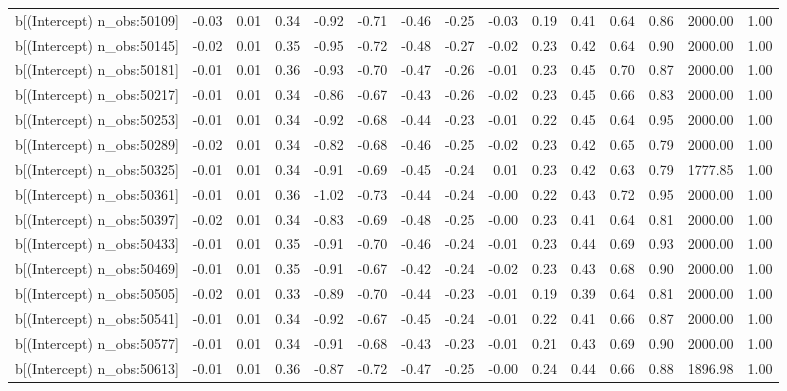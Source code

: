 \begin{table}[ht]
\begin{tabular}{rrrrrrrrrrrrrrr}
  b[(Intercept) n\_obs:50109] & -0.03 & 0.01 & 0.34 & -0.92 & -0.71 & -0.46 & -0.25 & -0.03 & 0.19 & 0.41 & 0.64 & 0.86 & 2000.00 & 1.00 \\ 
  b[(Intercept) n\_obs:50145] & -0.02 & 0.01 & 0.35 & -0.95 & -0.72 & -0.48 & -0.27 & -0.02 & 0.23 & 0.42 & 0.64 & 0.90 & 2000.00 & 1.00 \\ 
  b[(Intercept) n\_obs:50181] & -0.01 & 0.01 & 0.36 & -0.93 & -0.70 & -0.47 & -0.26 & -0.01 & 0.23 & 0.45 & 0.70 & 0.87 & 2000.00 & 1.00 \\ 
  b[(Intercept) n\_obs:50217] & -0.01 & 0.01 & 0.34 & -0.86 & -0.67 & -0.43 & -0.26 & -0.02 & 0.23 & 0.45 & 0.66 & 0.83 & 2000.00 & 1.00 \\ 
  b[(Intercept) n\_obs:50253] & -0.01 & 0.01 & 0.34 & -0.92 & -0.68 & -0.44 & -0.23 & -0.01 & 0.22 & 0.45 & 0.64 & 0.95 & 2000.00 & 1.00 \\ 
  b[(Intercept) n\_obs:50289] & -0.02 & 0.01 & 0.34 & -0.82 & -0.68 & -0.46 & -0.25 & -0.02 & 0.23 & 0.42 & 0.65 & 0.79 & 2000.00 & 1.00 \\ 
  b[(Intercept) n\_obs:50325] & -0.01 & 0.01 & 0.34 & -0.91 & -0.69 & -0.45 & -0.24 & 0.01 & 0.23 & 0.42 & 0.63 & 0.79 & 1777.85 & 1.00 \\ 
  b[(Intercept) n\_obs:50361] & -0.01 & 0.01 & 0.36 & -1.02 & -0.73 & -0.44 & -0.24 & -0.00 & 0.22 & 0.43 & 0.72 & 0.95 & 2000.00 & 1.00 \\ 
  b[(Intercept) n\_obs:50397] & -0.02 & 0.01 & 0.34 & -0.83 & -0.69 & -0.48 & -0.25 & -0.00 & 0.23 & 0.41 & 0.64 & 0.81 & 2000.00 & 1.00 \\ 
  b[(Intercept) n\_obs:50433] & -0.01 & 0.01 & 0.35 & -0.91 & -0.70 & -0.46 & -0.24 & -0.01 & 0.23 & 0.44 & 0.69 & 0.93 & 2000.00 & 1.00 \\ 
  b[(Intercept) n\_obs:50469] & -0.01 & 0.01 & 0.35 & -0.91 & -0.67 & -0.42 & -0.24 & -0.02 & 0.23 & 0.43 & 0.68 & 0.90 & 2000.00 & 1.00 \\ 
  b[(Intercept) n\_obs:50505] & -0.02 & 0.01 & 0.33 & -0.89 & -0.70 & -0.44 & -0.23 & -0.01 & 0.19 & 0.39 & 0.64 & 0.81 & 2000.00 & 1.00 \\ 
  b[(Intercept) n\_obs:50541] & -0.01 & 0.01 & 0.34 & -0.92 & -0.67 & -0.45 & -0.24 & -0.01 & 0.22 & 0.41 & 0.66 & 0.87 & 2000.00 & 1.00 \\ 
  b[(Intercept) n\_obs:50577] & -0.01 & 0.01 & 0.34 & -0.91 & -0.68 & -0.43 & -0.23 & -0.01 & 0.21 & 0.43 & 0.69 & 0.90 & 2000.00 & 1.00 \\ 
  b[(Intercept) n\_obs:50613] & -0.01 & 0.01 & 0.36 & -0.87 & -0.72 & -0.47 & -0.25 & -0.00 & 0.24 & 0.44 & 0.66 & 0.88 & 1896.98 & 1.00 \\ 

\end{tabular}
\end{table}

